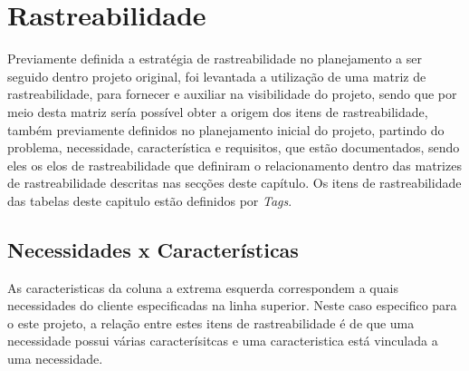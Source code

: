 \chapter{Rastreabilidade}
\label{sec:rastreabilidade}
Previamente definida a estratégia de rastreabilidade no planejamento a ser seguido dentro projeto original, foi levantada a utilização de uma matriz de rastreabilidade, para fornecer e auxiliar na visibilidade do projeto, sendo que por meio desta matriz sería possível obter a origem dos itens de rastreabilidade, também previamente definidos no planejamento inicial do projeto, partindo do problema, necessidade, característica e requisitos, que estão documentados, sendo eles os elos de rastreabilidade que definiram o relacionamento dentro das matrizes de rastreabilidade descritas nas secções deste capítulo. Os itens de rastreabilidade  das tabelas deste capitulo estão definidos por \textit{Tags}.

\section{Necessidades x Características}

As caracteristicas da coluna a extrema esquerda correspondem a quais necessidades do cliente especificadas na linha superior. Neste caso especifico para o este projeto, a relação entre estes itens de rastreabilidade é de que uma necessidade possui várias caracterísitcas e uma caracteristica está vinculada a uma necessidade.

